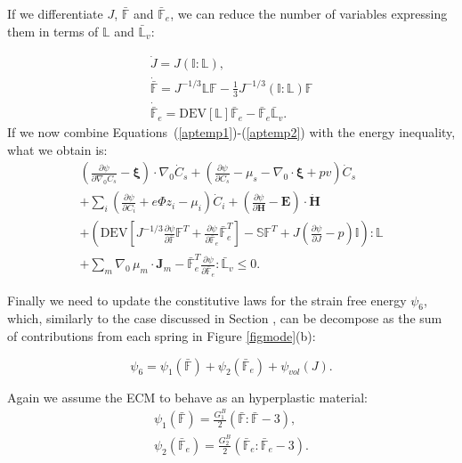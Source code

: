 \documentclass[runningheads]{llncs}
\newcommand{\F}{\ensuremath{\mathbb{F}}}
\newcommand{\LL}{\ensuremath{\mathbb{L}}}
\begin{document}
If we differentiate $J$, $\bar{\F}$ and $\bar{\F}_e$, we can reduce the number of variables expressing them in terms of $\LL$ and $\bar{\LL}_v$:

\begin{gather}
\dot{J} = J (\mathbb{I}:\LL),\\
\dot{\bar{\F}} = J^{-1/3} \LL \F - \frac{1}{3} J^{-1/3} (\mathbb{I}:\LL) \F \\
\dot{\bar{\F}}_e = \text{DEV}[\LL] \bar{\F}_e -\bar{\F}_e \bar{\LL}_v.\label{aptemp2}
\end{gather}
If we now combine Equations~(\ref{aptemp1})-(\ref{aptemp2}) with the energy inequality, what we obtain is:
\begin{equation}
\begin{aligned}
\left(\frac{\partial \psi}{\partial \nabla_0 C_s}-\boldsymbol{\xi}\right) \cdot \nabla_0 \dot{C}_s + \left(\frac{\partial \psi}{\partial C_s}-\mu_s-\nabla_0 \cdot \boldsymbol{\xi}+p v\right)\dot{C}_s\\
+ \sum_i\left(\frac{\partial \psi}{\partial C_i} + e\Phi z_i-\mu_i\right) \dot{C}_i +\left(\frac{\partial \psi}{\partial \mathbf{H}}-\mathbf{E}\right) \cdot \dot{\mathbf{H}}\\
 +\left(\text{DEV}\left[J^{-1/3}\frac{\partial \psi}{\partial \bar{\F}}\F^T + \frac{\partial \psi}{\partial \bar{\F}_e}\bar{\F}_e^{T}\right]- \mathbb{S}\F^T +J\left(\frac{\partial \psi}{\partial J} - p\right)\mathbb{I}\right):\LL\\
 + \sum_m \nabla_0 \,\mu_m \cdot \mathbf{J}_m - \bar{\F}_e^T\frac{\partial \psi}{\partial \bar{\F}_e}:\mathbb{\bar{L}}_v\leq 0 . \label{ineq2}
\end{aligned}
\end{equation}

Finally we need to update the constitutive laws for the strain free energy $\psi_6$, which, similarly to the case discussed in Section , can be decompose as the sum of contributions from each spring in Figure \ref{figmode}(b):

\begin{equation}
\psi_6 = \psi_1(\bar{\F}) + \psi_2(\bar{\F}_e) + \psi_{vol}(J).
\end{equation}

Again we assume the ECM to behave as an hyperplastic material:
\begin{eqnarray}
\psi_1(\bar{\F}) = \frac{G^B_1}{2} \left(\bar{\F}:\bar{\F} - 3\right),\\
\psi_2(\bar{\F}_e) = \frac{G^B_2}{2} \left(\bar{\F}_e:\bar{\F}_e - 3 \right).
\end{eqnarray}
\end{document}
